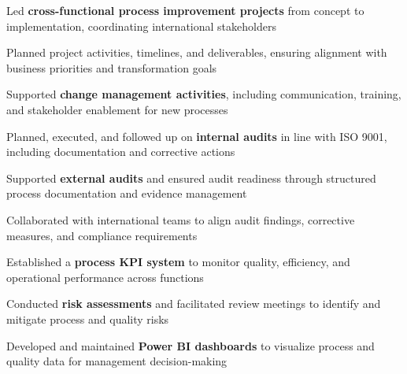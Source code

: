 \begin{cventries}
{\begin{cvitems}
      \end{cvitems}
      \begin{cvitems}
        \item {Led \textbf{cross-functional process improvement projects} from concept to implementation, coordinating international stakeholders}
        \item {Planned project activities, timelines, and deliverables, ensuring alignment with business priorities and transformation goals}
        \item {Supported \textbf{change management activities}, including communication, training, and stakeholder enablement for new processes}
      \end{cvitems}
      \begin{cvitems}
        \item {Planned, executed, and followed up on \textbf{internal audits} in line with ISO 9001, including documentation and corrective actions}
        \item {Supported \textbf{external audits} and ensured audit readiness through structured process documentation and evidence management}
        \item {Collaborated with international teams to align audit findings, corrective measures, and compliance requirements}
      \end{cvitems}
      \begin{cvitems}
        \item {Established a \textbf{process KPI system} to monitor quality, efficiency, and operational performance across functions}
        \item {Conducted \textbf{risk assessments} and facilitated review meetings to identify and mitigate process and quality risks}
        \item {Developed and maintained \textbf{Power BI dashboards} to visualize process and quality data for management decision-making}
      \end{cvitems}  
    }


\end{cventries}
